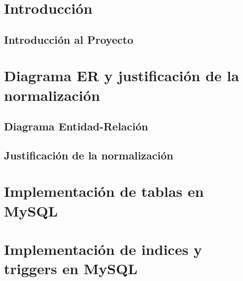 \documentclass[12pt]{article}
\begin{document}


\tableofcontents
\newpage

\section{Introducción}
\subsection{Introducción al Proyecto}


\section{Diagrama ER y justificación de la normalización}

\subsection{Diagrama Entidad-Relación}


\subsection{Justificación de la normalización}


\section{Implementación  de tablas en MySQL}


\section{Implementación de indices y triggers en MySQL}

\end{document}
